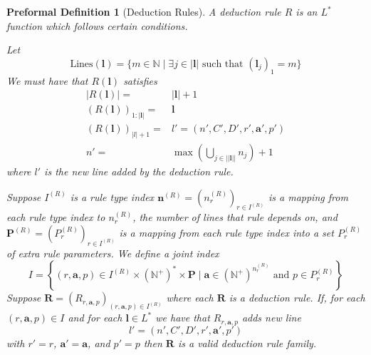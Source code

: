 \documentclass[oneside, 12pt]{book}
\theoremstyle{break}
\newtheorem{preformal definition}[definition]{Preformal Definition}
\newtheorem{preformal theorem}[theorem]{Preformal Theorem}
\newcommand{\bv}[1]{\boldsymbol{#1}}
\newcommand{\N}[0]{\mathbb{N}}
\newcommand{\norm}[1]{\left|#1\right|}
\begin{document}
		\begin{preformal definition}[Deduction Rules]
			A deduction rule $R$ is an $L^*$ function which follows certain conditions.
			
			Let 
			\begin{equation*}
				\text{Lines}(\bv{l}) = \{m \in \N \mid \exists j \in \norm{\bv{l}} \text{ such that } (\bv{l}_j)_1 = m \}
			\end{equation*}
			We must have that $R(\bv{l})$ satisfies
			\begin{align*}
				\norm{R(\bv{l})} =& \norm{\bv{l}} + 1\\
				(R(\bv{l}))_{1:\norm{\bv{l}}} =& \bv{l}\\
				(R(\bv{l}))_{\norm{l} + 1} =& l' = (n', C', D', r', \bv{a}', p')\\
				n' =& \max\left(\bigcup_{j \in |\norm{\bv{l}}|} n_j\right) + 1
			\end{align*}
			where $l'$ is the new line added by the deduction rule.
			
			Suppose $I^{(R)}$ is a rule type index $\bv{n}^{(R)} = (n^{(R)}_r)_{r\in I^{(R)}}$ is a mapping from each rule type index to $n_r^{(R)}$, the number of lines that rule depends on, and $\bv{P}^{(R)} = (P^{(R)}_r)_{r\in I^{(R)}}$ is a mapping from each rule type index into a set $P_r^{(R)}$ of extra rule parameters.
			We define a joint index
			\begin{equation*}
				I = \left\{(r, \bv{a}, p) \in I^{(R)} \times (\N^+)^* \times \bv{P}\mid \bv{a} \in (\N^+)^{n^{(R)}_r} \text{ and } p \in P^{(R)}_r\right\}
			\end{equation*}
			Suppose $\bv{R} = (R_{r, \bv{a}, p})_{(r, \bv{a}, p) \in I^{(R)}}$ where each $\bv{R}$ is a deduction rule.
			If, for each $(r, \bv{a}, p) \in I$ and for each $\bv{l} \in L^*$ we have that $R_{r, \bv{a}, p}$ adds new line 
			\begin{equation*}
				l' = (n', C', D', r', \bv{a}', p')
			\end{equation*}
			with $r' = r$, $\bv{a}' = \bv{a}$, and $p'=p$ then $\bv{R}$ is a valid deduction rule family.			
		\end{preformal definition}
	
\end{document}
